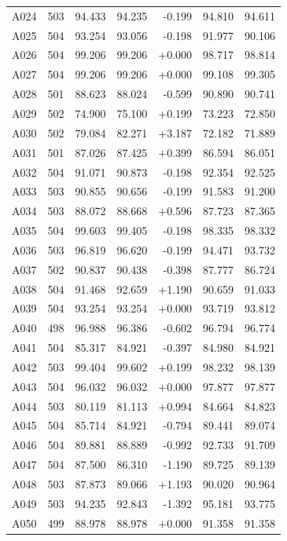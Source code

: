 \begin{longtable}{lrrrrrr}
A024 & 503 & 94.433 & 94.235 & -0.199 & 94.810 & 94.611 \\
A025 & 504 & 93.254 & 93.056 & -0.198 & 91.977 & 90.106 \\
A026 & 504 & 99.206 & 99.206 & +0.000 & 98.717 & 98.814 \\
A027 & 504 & 99.206 & 99.206 & +0.000 & 99.108 & 99.305 \\
A028 & 501 & 88.623 & 88.024 & -0.599 & 90.890 & 90.741 \\
A029 & 502 & 74.900 & 75.100 & +0.199 & 73.223 & 72.850 \\
A030 & 502 & 79.084 & 82.271 & +3.187 & 72.182 & 71.889 \\
A031 & 501 & 87.026 & 87.425 & +0.399 & 86.594 & 86.051 \\
A032 & 504 & 91.071 & 90.873 & -0.198 & 92.354 & 92.525 \\
A033 & 503 & 90.855 & 90.656 & -0.199 & 91.583 & 91.200 \\
A034 & 503 & 88.072 & 88.668 & +0.596 & 87.723 & 87.365 \\
A035 & 504 & 99.603 & 99.405 & -0.198 & 98.335 & 98.332 \\
A036 & 503 & 96.819 & 96.620 & -0.199 & 94.471 & 93.732 \\
A037 & 502 & 90.837 & 90.438 & -0.398 & 87.777 & 86.724 \\
A038 & 504 & 91.468 & 92.659 & +1.190 & 90.659 & 91.033 \\
A039 & 504 & 93.254 & 93.254 & +0.000 & 93.719 & 93.812 \\
A040 & 498 & 96.988 & 96.386 & -0.602 & 96.794 & 96.774 \\
A041 & 504 & 85.317 & 84.921 & -0.397 & 84.980 & 84.921 \\
A042 & 503 & 99.404 & 99.602 & +0.199 & 98.232 & 98.139 \\
A043 & 504 & 96.032 & 96.032 & +0.000 & 97.877 & 97.877 \\
A044 & 503 & 80.119 & 81.113 & +0.994 & 84.664 & 84.823 \\
A045 & 504 & 85.714 & 84.921 & -0.794 & 89.441 & 89.074 \\
A046 & 504 & 89.881 & 88.889 & -0.992 & 92.733 & 91.709 \\
A047 & 504 & 87.500 & 86.310 & -1.190 & 89.725 & 89.139 \\
A048 & 503 & 87.873 & 89.066 & +1.193 & 90.020 & 90.964 \\
A049 & 503 & 94.235 & 92.843 & -1.392 & 95.181 & 93.775 \\
A050 & 499 & 88.978 & 88.978 & +0.000 & 91.358 & 91.358 \\

\end{longtable}
